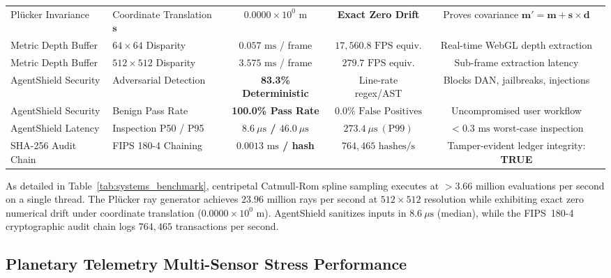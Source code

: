 \documentclass[10pt,twocolumn,letterpaper]{article}
\begin{document}
\begin{table}[t]
\begin{tabular}{llccc}
Pl\"ucker Invariance & Coordinate Translation $\mathbf{s}$ & \textbf{$0.0000 \times 10^0\text{ m}$} & \textbf{Exact Zero Drift} & Proves covariance $\mathbf{m}' = \mathbf{m} + \mathbf{s} \times \mathbf{d}$ \\
Metric Depth Buffer & $64 \times 64$ Disparity & $0.057\text{ ms}$ / frame & $17,560.8\text{ FPS equiv.}$ & Real-time WebGL depth extraction \\
Metric Depth Buffer & $512 \times 512$ Disparity & $3.575\text{ ms}$ / frame & $279.7\text{ FPS equiv.}$ & Sub-frame extraction latency \\
AgentShield Security & Adversarial Detection & \textbf{83.3\% Deterministic} & Line-rate regex/AST & Blocks DAN, jailbreaks, injections \\
AgentShield Security & Benign Pass Rate & \textbf{100.0\% Pass Rate} & $0.0\%\text{ False Positives}$ & Uncompromised user workflow \\
AgentShield Latency & Inspection P50 / P95 & \textbf{$8.6\ \mu\text{s}$ / $46.0\ \mu\text{s}$} & $273.4\ \mu\text{s}\ (\text{P99})$ & $< 0.3\text{ ms}$ worst-case inspection \\
SHA-256 Audit Chain & FIPS 180-4 Chaining & \textbf{$0.0013\text{ ms}$ / hash} & \textbf{$764,465\text{ hashes/s}$} & Tamper-evident ledger integrity: \textbf{TRUE} \\
\bottomrule
\end{tabular}
\end{table}

As detailed in Table~\ref{tab:systems_benchmark}, centripetal Catmull-Rom spline sampling executes at $> 3.66$ million evaluations per second on a single thread. The Pl\"ucker ray generator achieves $23.96$ million rays per second at $512 \times 512$ resolution while exhibiting exact zero numerical drift under coordinate translation ($0.0000 \times 10^0\text{ m}$). AgentShield sanitizes inputs in $8.6\ \mu\text{s}$ (median), while the FIPS~180-4 cryptographic audit chain logs $764,465$ transactions per second.

\subsection{Planetary Telemetry Multi-Sensor Stress Performance}
\end{document}
